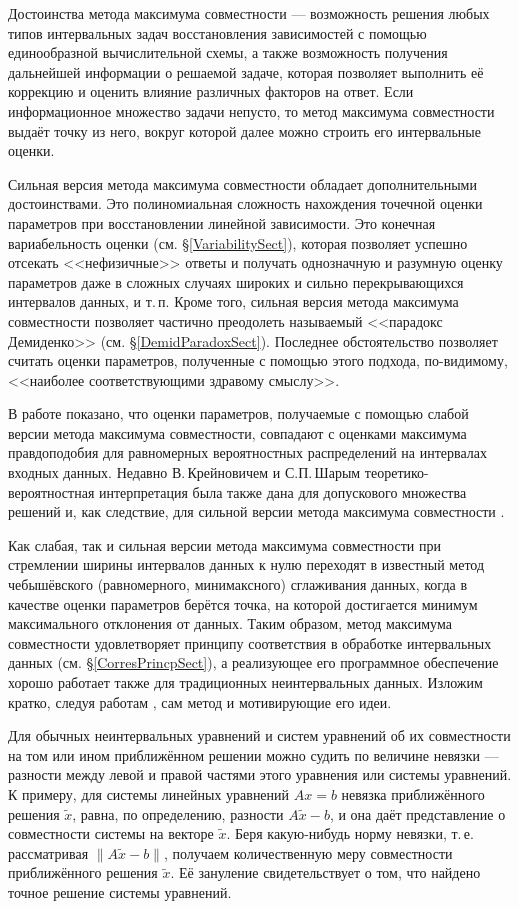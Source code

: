 \documentclass[a5paper,openany]{book}
\begin{document}
Достоинства метода максимума совместности --- возможность решения любых типов интервальных 
задач восстановления зависимостей с помощью единообразной вычислительной схемы, а также 
возможность получения дальнейшей информации о решаемой задаче, которая позволяет выполнить 
её коррекцию и оценить влияние различных факторов на ответ. Если информационное множество 
задачи непусто, то метод максимума совместности выдаёт точку из него, вокруг которой далее   
можно строить его интервальные оценки. 
  
Сильная версия метода максимума совместности обладает дополнительными достоинствами. 
Это полиномиальная сложность нахождения точечной оценки параметров при восстановлении 
линейной зависимости. Это конечная вариабельность оценки (см. \S\ref{VariabilitySect}), 
которая позволяет успешно отсекать <<нефизичные>> ответы и получать однозначную и разумную 
оценку параметров даже в сложных случаях широких и сильно перекрывающихся интервалов данных, 
и т.\,п. Кроме того, сильная версия метода максимума совместности позволяет частично 
преодолеть называемый <<парадокс Демиденко>> (см. \S\ref{DemidParadoxSect}).  Последнее 
обстоятельство позволяет считать оценки параметров, полученные с помощью этого подхода, 
по-видимому, <<наиболее соответствующими здравому смыслу>>.  
  
В работе \cite{KreinovichShary} показано, что оценки параметров, получаемые с помощью 
слабой версии метода максимума совместности, совпадают с оценками максимума правдоподобия 
для равномерных вероятностных распределений на интервалах входных данных. Недавно 
В.\,Крейновичем и С.П.\,Шарым теоретико-вероятностная интерпретация была также дана 
для допускового множества решений и, как следствие, для сильной версии метода максимума 
совместности \cite{VladikShary-2021}. 
  
Как слабая, так и сильная версии метода максимума совместности при стремлении ширины 
интервалов данных к нулю переходят в известный метод чебышёвского (равномерного, 
минимаксного) сглаживания данных, когда в качестве оценки параметров берётся точка, 
на которой достигается минимум максимального отклонения от данных. Таким образом, 
метод максимума совместности удовлетворяет принципу соответствия в обработке интервальных 
данных (см. \S\ref{CorresPrincpSect}), а реализующее его программное обеспечение хорошо 
работает также для традиционных неинтервальных данных. Изложим кратко, следуя работам 
\cite{SharysReserve,SShary2022}, сам метод и мотивирующие его идеи. 
  
Для обычных неинтервальных уравнений и систем уравнений об их совместности на том 
или ином приближённом решении можно судить по величине невязки --- разности между 
левой и правой частями этого уравнения или системы уравнений. К примеру, для системы 
линейных уравнений $Ax = b$ невязка приближённого решения $\tilde{x}$, равна, 
по определению, разности $A\tilde{x} - b$, и она даёт представление о совместности 
системы на векторе $\tilde{x}$. Беря какую-нибудь норму невязки, т.\,е. рассматривая 
$\|A\tilde{x} - b\|$, получаем количественную меру совместности приближённого 
решения $\tilde{x}$. Её зануление свидетельствует о том, что найдено точное решение 
системы уравнений. 
  
\end{document}

